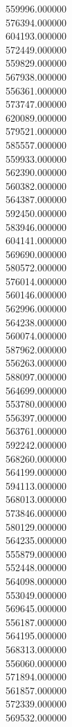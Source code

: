 559996.000000\\
576394.000000\\
604193.000000\\
572449.000000\\
559829.000000\\
567938.000000\\
556361.000000\\
573747.000000\\
620089.000000\\
579521.000000\\
585557.000000\\
559933.000000\\
562390.000000\\
560382.000000\\
564387.000000\\
592450.000000\\
583946.000000\\
604141.000000\\
569690.000000\\
580572.000000\\
576014.000000\\
560146.000000\\
562996.000000\\
564238.000000\\
560074.000000\\
587962.000000\\
556263.000000\\
588097.000000\\
564699.000000\\
553780.000000\\
556397.000000\\
563761.000000\\
592242.000000\\
568260.000000\\
564199.000000\\
594113.000000\\
568013.000000\\
573846.000000\\
580129.000000\\
564235.000000\\
555879.000000\\
552448.000000\\
564098.000000\\
553049.000000\\
569645.000000\\
556187.000000\\
564195.000000\\
568313.000000\\
556060.000000\\
571894.000000\\
561857.000000\\
572339.000000\\
569532.000000\\

